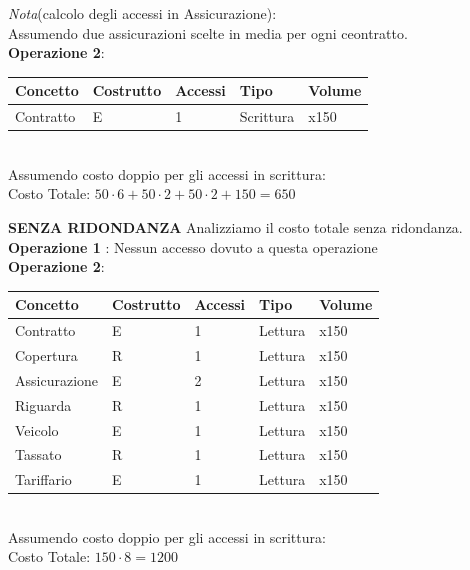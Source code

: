 \documentclass[10pt,a4paper]{article}
\begin{document}
\noindent
\textit{Nota}(calcolo degli accessi in Assicurazione):\\
Assumendo due assicurazioni scelte in media per ogni ceontratto. \\

\textbf{Operazione 2}:\\
\begin{table} [h!]
\centering
\begin{tabular}{|p{2cm}|p{2cm}|p{2cm}|p{2cm}|p{1.5cm}|}
\hline
\textbf{Concetto} & \textbf{Costrutto} & \textbf{Accessi} & \textbf{Tipo} & \textbf{Volume} \\
\hline
Contratto & E & 1 & Scrittura & x150 \\
\hline
\end{tabular}
\end{table}
\\

\noindent
Assumendo costo doppio per gli accessi in scrittura:\\
Costo Totale: $50\cdot6 + 50\cdot2 + 50\cdot2 +150 = 650$


\textbf{SENZA RIDONDANZA} Analizziamo il costo totale senza ridondanza.\\

\noindent
\textbf{Operazione 1 }: Nessun accesso dovuto a questa operazione\\
\noindent
\textbf{Operazione 2}:\\
\begin{table} [h!]
\centering
\begin{tabular}{|p{2cm}|p{2cm}|p{2cm}|p{2cm}|p{1.5cm}|}
\hline
\textbf{Concetto} & \textbf{Costrutto} & \textbf{Accessi} & \textbf{Tipo} & \textbf{Volume} \\
\hline
Contratto & E & 1 & Lettura & x150 \\
\hline
Copertura & R & 1 & Lettura & x150 \\
\hline
Assicurazione & E & 2 & Lettura & x150 \\
\hline
Riguarda & R & 1 & Lettura & x150 \\
\hline
Veicolo & E & 1 & Lettura & x150 \\
\hline
Tassato & R & 1 & Lettura & x150 \\
\hline
Tariffario & E & 1 & Lettura & x150 \\
\hline
\end{tabular}
\end{table}
\\
\noindent
Assumendo costo doppio per gli accessi in scrittura:\\
 Costo Totale: $150\cdot8 = 1200$\\
\end{document}
